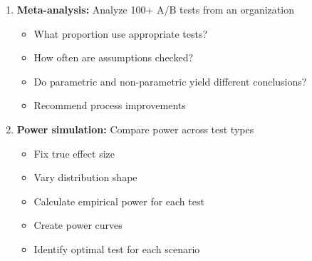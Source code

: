 \begin{enumerate}
    \item \textbf{Meta-analysis:} Analyze 100+ A/B tests from an organization
    \begin{itemize}
        \item What proportion use appropriate tests?
        \item How often are assumptions checked?
        \item Do parametric and non-parametric yield different conclusions?
        \item Recommend process improvements
    \end{itemize}

    \item \textbf{Power simulation:} Compare power across test types
    \begin{itemize}
        \item Fix true effect size
        \item Vary distribution shape
        \item Calculate empirical power for each test
        \item Create power curves
        \item Identify optimal test for each scenario
    \end{itemize}
\end{enumerate}
